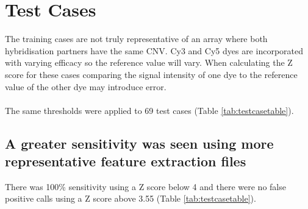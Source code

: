 \section{Test Cases}
The training cases are not truly representative of an array where both hybridisation partners have the same CNV. Cy3 and Cy5 dyes are incorporated with varying efficacy so the reference value will vary. When calculating the Z score for these cases comparing the signal intensity of one dye to the reference value of the other dye may introduce error.
\paragraph*{}
The same thresholds were applied to 69 test cases (Table \ref{tab:testcasetable}). 



\subsection{A greater sensitivity was seen using more representative feature extraction files}
There was 100\% sensitivity using a Z score below 4 and there were no false positive calls using a Z score above 3.55 (Table \ref{tab:testcasetable}). 


\begin{table}[h]
\centering
\caption[Test cases: Calls made at a range of thresholds]{Test cases: A call was made in the expected CNV region in all cases with a threshold below 4. There were no false positive calls made with a threshold above 3.55}
\label{tab:testcasetable}
\end{table}

